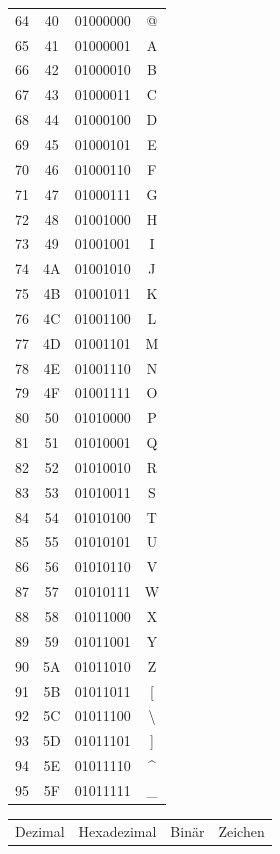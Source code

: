 \begin{table}[H]
\begin{tabular}{cccc}
        64 & 40 & 01000000 & @ \\
        65 & 41 & 01000001 & A \\
        66 & 42 & 01000010 & B \\
        67 & 43 & 01000011 & C \\
        68 & 44 & 01000100 & D \\
        69 & 45 & 01000101 & E \\
        70 & 46 & 01000110 & F \\
        71 & 47 & 01000111 & G \\
        72 & 48 & 01001000 & H \\
        73 & 49 & 01001001 & I \\
        74 & 4A & 01001010 & J \\
        75 & 4B & 01001011 & K \\
        76 & 4C & 01001100 & L \\
        77 & 4D & 01001101 & M \\
        78 & 4E & 01001110 & N \\
        79 & 4F & 01001111 & O \\
        80 & 50 & 01010000 & P \\
        81 & 51 & 01010001 & Q \\
        82 & 52 & 01010010 & R \\
        83 & 53 & 01010011 & S \\
        84 & 54 & 01010100 & T \\
        85 & 55 & 01010101 & U \\
        86 & 56 & 01010110 & V \\
        87 & 57 & 01010111 & W \\
        88 & 58 & 01011000 & X \\
        89 & 59 & 01011001 & Y \\
        90 & 5A & 01011010 & Z \\
        91 & 5B & 01011011 & [ \\
        92 & 5C & 01011100 & \textbackslash \\
        93 & 5D & 01011101 & ] \\
        94 & 5E & 01011110 & \^{} \\
        95 & 5F & 01011111 & \_ \\
        \bottomrule
        \end{tabular}
    \begin{tabular}{cccc}
            \toprule
            Dezimal & Hexadezimal & Binär & Zeichen \\

\end{tabular}
\end{table}
